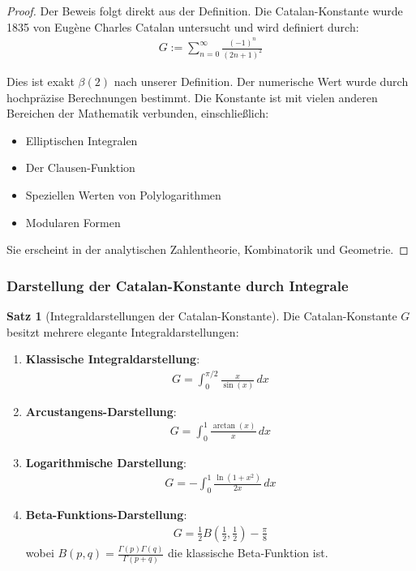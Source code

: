 \documentclass[a4paper,12pt,twoside]{report}
\theoremstyle{definition}
\newtheorem{satz}{Satz}
\begin{document}
\begin{proof}
Der Beweis folgt direkt aus der Definition. Die Catalan-Konstante wurde 1835 von Eugène Charles Catalan untersucht und wird definiert durch:
\begin{align}
	G := \sum_{n=0}^{\infty} \frac{(-1)^n}{(2n+1)^2}
\end{align}

Dies ist exakt $\beta(2)$ nach unserer Definition. Der numerische Wert wurde durch hochpräzise Berechnungen bestimmt. Die Konstante ist mit vielen anderen Bereichen der Mathematik verbunden, einschließlich:

\begin{itemize}
	\item Elliptischen Integralen
	\item Der Clausen-Funktion
	\item Speziellen Werten von Polylogarithmen
	\item Modularen Formen
\end{itemize}

Sie erscheint in der analytischen Zahlentheorie, Kombinatorik und Geometrie.
\end{proof}

\subsubsection{Darstellung der Catalan-Konstante durch Integrale}

\begin{satz}[Integraldarstellungen der Catalan-Konstante]
Die Catalan-Konstante $G$ besitzt mehrere elegante Integraldarstellungen:

\begin{enumerate}
	\item \textbf{Klassische Integraldarstellung}:
	\begin{align}
		G = \int_0^{\pi/2} \frac{x}{\sin(x)} \, dx
		\label{eq:catalan_integral_1}
	\end{align}
	
	\item \textbf{Arcustangens-Darstellung}:
	\begin{align}
		G = \int_0^1 \frac{\arctan(x)}{x} \, dx
		\label{eq:catalan_integral_2}
	\end{align}
	
	\item \textbf{Logarithmische Darstellung}:
	\begin{align}
		G = -\int_0^1 \frac{\ln(1+x^2)}{2x} \, dx
		\label{eq:catalan_integral_3}
	\end{align}
	
	\item \textbf{Beta-Funktions-Darstellung}:
	\begin{align}
		G = \frac{1}{2} B\left(\frac{1}{2}, \frac{1}{2}\right) - \frac{\pi}{8}
		\label{eq:catalan_beta}
	\end{align}
	wobei $B(p,q) = \frac{\Gamma(p)\Gamma(q)}{\Gamma(p+q)}$ die klassische Beta-Funktion ist.
\end{enumerate}
\end{satz}
\end{document}
